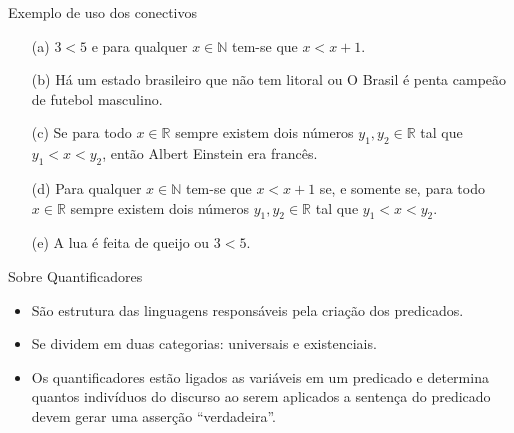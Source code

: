 \documentclass[aspectratio=169]{beamer}
\begin{document}
	\begin{frame}{Exemplo de uso dos conectivos}
		\begin{itemize}
			\item[(a)] $3 < 5$ e para qualquer $x \in\mathbb{N}$ tem-se que $x < x + 1$.
			\item[(b)] Há um estado brasileiro que não tem litoral ou O Brasil é penta campeão de futebol masculino.
			\item[(c)] Se para todo $x \in \mathbb{R}$ sempre existem dois números $y_1, y_2 \in \mathbb{R}$ tal que $y_1 < x < y_2$, então Albert Einstein era francês.
			\item[(d)] Para qualquer $x \in\mathbb{N}$ tem-se que $x < x + 1$ se, e somente se, para todo $x \in \mathbb{R}$ sempre existem dois números $y_1, y_2 \in \mathbb{R}$ tal que $y_1 < x < y_2$.
			\item[(e)] A lua é feita de queijo ou $3 < 5$.
		\end{itemize}
	\end{frame}

	\begin{frame}{Sobre Quantificadores}
		\begin{itemize}
			\item São estrutura das linguagens responsáveis pela criação dos predicados.
			\item Se dividem em duas categorias: {\color{red} universais} e {\color{red}existenciais}.
			\item Os quantificadores estão ligados as variáveis em um predicado e determina quantos indivíduos do discurso ao serem aplicados a sentença do predicado devem gerar uma asserção ``verdadeira''. 
		\end{itemize}
	\end{frame}
\end{document}
